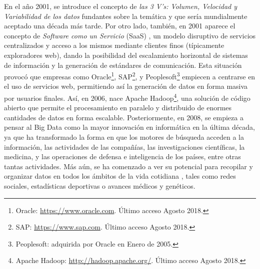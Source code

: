 \bigskip En el año 2001, se introduce el concepto de \textit{las 3 V’s: Volumen, Velocidad y Variabilidad de los datos} \citep{laney20013d} fundantes sobre la temática y que sería mundialmente aceptado una década más tarde. Por otro lado, también, en 2001 aparece el concepto de \textit{Software como un Servicio} (SaaS) \citep{hoch2001software}, un modelo disruptivo de servicios centralizados y acceso a los mismos mediante clientes finos (típicamente exploradores web), dando la posibilidad del escalamiento horizontal de sistemas de información y la generación de estándares de comunicación. Esta situación provocó que empresas como Oracle\footnote{Oracle: \url{https://www.oracle.com}. Último acceso Agosto 2018.}, SAP\footnote{SAP: \url{https://www.sap.com}. Último acceso Agosto 2018.}, y Peoplesoft\footnote{Peoplesoft: adquirida por Oracle en Enero de 2005.} empiecen a centrarse en el uso de servicios web, permitiendo así la generación de datos en forma masiva por usuarios finales. Así, en 2006, nace Apache Hadoop\footnote{Apache Hadoop: \url{http://hadoop.apache.org/}. Último acceso Agosto 2018.}, una solución de código abierto que permite el procesamiento en paralelo y distribuido de enormes cantidades de datos en forma escalable. Posteriormente, en 2008, se empieza a pensar al Big Data como la mayor innovación en informática en la última década, ya que ha transformado la forma en que los motores de búsqueda acceden a la información, las actividades de las compañías, las investigaciones científicas, la medicina, y las operaciones de defensa e inteligencia de los países, entre otras tantas actividades. Más aún, se ha comenzado a ver su potencial para recopilar y organizar datos en todos los ámbitos de la vida cotidiana \citep{bryant2008big}, tales como redes sociales, estadísticas deportivas o avances médicos y genéticos.

